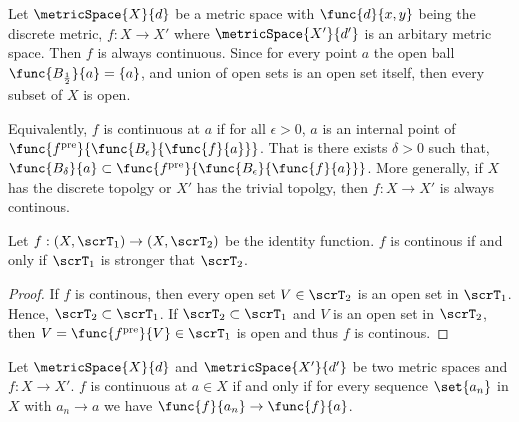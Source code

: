 \begin{example}
    Let \(\metricSpace{X}{d}\) be a metric space with \(\func{d}{x,y}\) being the discrete metric, \(f : X \to X'\) where \(\metricSpace{X'}{d'}\) is an arbitary metric space. Then \(f\) is always continuous. Since for every point \(a\) the open ball \(\func{B_{\frac{1}{2}}}{a} = \{ a \}\), and union of open sets is an open set itself, then every subset of \(X\) is open.
\end{example}
Equivalently, \(f\) is continuous at \(a\) if for all \(\epsilon > 0\), \(a\) is an internal point of \(\func{f^{\mathrm{pre}}}{\func{B_\epsilon}{\func{f}{a}}}\). That is there exists \(\delta > 0\) such that, \(\func{B_\delta}{a}  \subset \func{f^{\mathrm{pre}}}{\func{B_\epsilon}{\func{f}{a}}}\). More generally, if \(X\) has the discrete topolgy or \(X'\) has the trivial topolgy, then \(f:X\to X'\) is always continous.

\begin{proposition}
    Let \(f: (X,\scrT_1) \to (X,\scrT_2)\) be the identity function. \(f\) is continous if and only if \(\scrT_1\) is stronger that \(\scrT_2\).
\end{proposition}

\begin{proof}
    If \(f\) is continous, then every open set \(V \in \scrT_2\) is an open set in \(\scrT_1\). Hence, \(\scrT_2 \subset \scrT_1\). If \(\scrT_2 \subset \scrT_1\) and \(V\) is an open set in \(\scrT_2\), then \(V = \func{f^{\mathrm{pre}}}{V} \in \scrT_1\) is open and thus \(f\) is continous.
\end{proof}

\begin{theorem}
    Let \(\metricSpace{X}{d}\) and \(\metricSpace{X'}{d'}\) be two metric spaces and \( f: X \to X' \). \(f\) is continuous at \( a \in X\) if and only if for every sequence \(\set{ a_n}\) in \(X\) with \(a_n \to a\) we have \(\func{f}{a_n} \to \func{f}{a}\).
\end{theorem}

